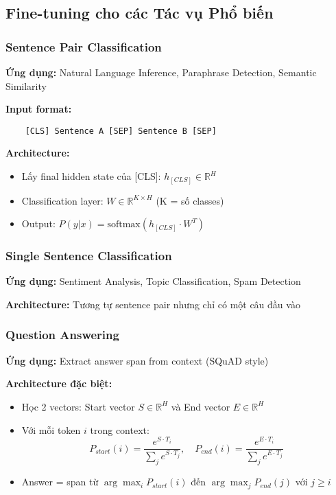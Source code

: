     \subsection{Fine-tuning cho các Tác vụ Phổ biến}
    \label{ssec:vi_du_tinh_chinh}
    
    \subsubsection{Sentence Pair Classification}
    \textbf{Ứng dụng:} Natural Language Inference, Paraphrase Detection, Semantic Similarity
    
    \textbf{Input format:}
    \begin{verbatim}
    [CLS] Sentence A [SEP] Sentence B [SEP]
    \end{verbatim}
    
    \textbf{Architecture:}
    \begin{itemize}
        \item Lấy final hidden state của [CLS]: $h_{[CLS]} \in \mathbb{R}^H$
        \item Classification layer: $W \in \mathbb{R}^{K \times H}$ (K = số classes)
        \item Output: $P(y|x) = \text{softmax}(h_{[CLS]} \cdot W^T)$
    \end{itemize}
    
    \subsubsection{Single Sentence Classification}  
    \textbf{Ứng dụng:} Sentiment Analysis, Topic Classification, Spam Detection
    
    \textbf{Architecture:} Tương tự sentence pair nhưng chỉ có một câu đầu vào
    
    \subsubsection{Question Answering}
    \textbf{Ứng dụng:} Extract answer span from context (SQuAD style)
    
    \textbf{Architecture đặc biệt:}
    \begin{itemize}
        \item Học 2 vectors: Start vector $S \in \mathbb{R}^H$ và End vector $E \in \mathbb{R}^H$
        \item Với mỗi token $i$ trong context:
        \begin{equation}
        P_{start}(i) = \frac{e^{S \cdot T_i}}{\sum_j e^{S \cdot T_j}}, \quad P_{end}(i) = \frac{e^{E \cdot T_i}}{\sum_j e^{E \cdot T_j}}
        \label{eq:qa_probability}
        \end{equation}
        \item Answer = span từ $\arg\max_i P_{start}(i)$ đến $\arg\max_j P_{end}(j)$ với $j \geq i$
    \end{itemize}
    

